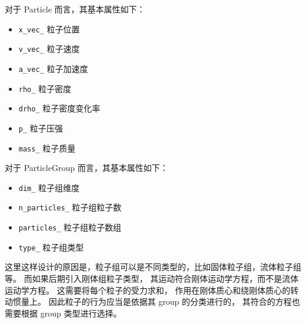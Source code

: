 \begin{frame}
    对于 Particle 而言，其基本属性如下：
    \begin{itemize}
        \item \texttt{x\_vec\_} 粒子位置
        \item \texttt{v\_vec\_} 粒子速度
        \item \texttt{a\_vec\_} 粒子加速度
        \item \texttt{rho\_} 粒子密度
        \item \texttt{drho\_} 粒子密度变化率
        \item \texttt{p\_} 粒子压强
        \item \texttt{mass\_} 粒子质量
    \end{itemize}
\end{frame}

\begin{frame}
    对于 ParticleGroup 而言，其基本属性如下：
    \begin{itemize}
        \item \texttt{dim\_} 粒子组维度
        \item \texttt{n\_particles\_} 粒子组粒子数
        \item \texttt{particles\_} 粒子组粒子数组
        \item \texttt{type\_} 粒子组类型
    \end{itemize}

    这里这样设计的原因是，粒子组可以是不同类型的，比如固体粒子组，流体粒子组等。
    而如果后期引入刚体组粒子类型，
    其运动符合刚体运动学方程，而不是流体运动学方程。
    这需要将每个粒子的受力求和，
    作用在刚体质心和绕刚体质心的转动惯量上。
    因此粒子的行为应当是依据其 group 的分类进行的，
    其符合的方程也需要根据 group 类型进行选择。

\end{frame}

